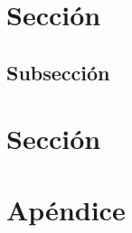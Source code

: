 \documentclass[12pt, letterpaper]{article}
\title{\doctitle}
\author{Autor}
\date{\monthname[\month] de \the\year}
\begin{document}
\maketitle

\newpage
\tableofcontents

\newpage
\section{Sección}
\lipsum[1-2]
\cite{knuth1984}

\subsection{Subsección}
\lipsum[3]

\section{Sección}
\lipsum[1-2]
\newpage

\printbibliography
{}

\appendix
\section{Apéndice}
\lipsum[4-5]
\end{document}
